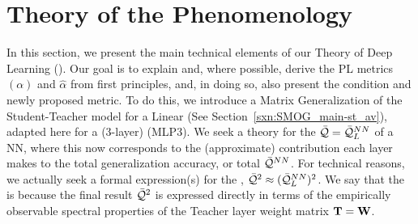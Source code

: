\section{\SemiEmpirical Theory of the \HTSR Phenomenology}
\label{sxn:matgen}

In this section, we present the main technical elements of our \SemiEmpirical Theory of Deep Learning (\SETOL).
Our goal is to explain and, where possible, derive the \HTSR PL metrics \ALPHA $(\alpha)$ and \ALPHAHAT $\hat{\alpha}$
from first principles, and, in doing so, also present the \TRACELOG condition and
newly proposed \WW\DETX metric.
To do this, we introduce a Matrix Generalization of the Student-Teacher model for a Linear \Perceptron
(See Section~\ref{sxn:SMOG_main-st_av}), 
adapted here for a (3-layer) \MultiLayerPerceptron  (MLP3).
We seek a theory for the \LayerQuality $\bar{\mathcal{Q}}=\bar{\mathcal{Q}}^{NN}_{L}$ of a NN, where
this \LayerQuality now corresponds to the (approximate) contribution each layer makes to the total
generalization accuracy, or total \Quality $\bar{\mathcal{Q}}^{NN}$.
For technical reasons, we actually seek a formal expression(s) for the \LayerQualitySquared,
$\bar{\mathcal{Q}}^{2}\approx(\bar{\mathcal{Q}}^{NN}_{L})^2$. 
We say that the \SETOL is \SemiEmpirical because the final result $\bar{\mathcal{Q}}^{2}$ is expressed directly in terms
of the empirically observable spectral properties of the Teacher layer weight matrix ${\mathbf{T}}={\mathbf{W}}$.







